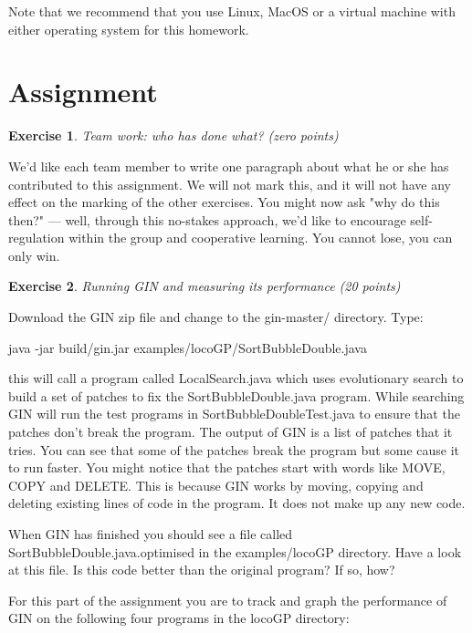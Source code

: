 \documentclass{pracs}
\newtheorem{exercise}{Exercise}
\begin{document}
\vspace{3mm}

Note that we recommend that you use Linux, MacOS or a virtual machine with either operating system for this homework.

\section{Assignment}

\begin{exercise}
Team work: who has done what? (zero points)
\end{exercise}

We'd like each team member to write one paragraph about what he or she has contributed to this assignment. We will not mark this, and it will not have any effect on the marking of the other exercises. You might now ask "why do this then?" --- well, through this no-stakes approach, we'd like to encourage self-regulation within the group and cooperative learning. You cannot lose, you can only win.


\begin{exercise}
Running GIN and measuring its performance (20 points)
\end{exercise}

Download the GIN zip file and change to the gin-master/ directory. Type:

\hspace{10mm}java -jar build/gin.jar examples/locoGP/SortBubbleDouble.java

this will call a program called LocalSearch.java which uses evolutionary search to build a set of patches to fix the SortBubbleDouble.java program. While searching GIN will run the test programs in SortBubbleDoubleTest.java to ensure that the patches don’t break the program. The output of GIN is a list of patches that it tries. You can see that some of the patches break the program but some cause it to run faster. You might notice that the patches start with words like MOVE, COPY and DELETE. This is because GIN works by moving, copying and deleting existing lines of code in the program. It does not make up any new code.

When GIN has finished you should see a file called SortBubbleDouble.java.optimised in the examples/locoGP directory. Have a look at this file. Is this code better than the original program? If so, how?

For this part of the assignment you are to track and graph the performance of GIN on the following four programs in the locoGP directory:
\end{document}
